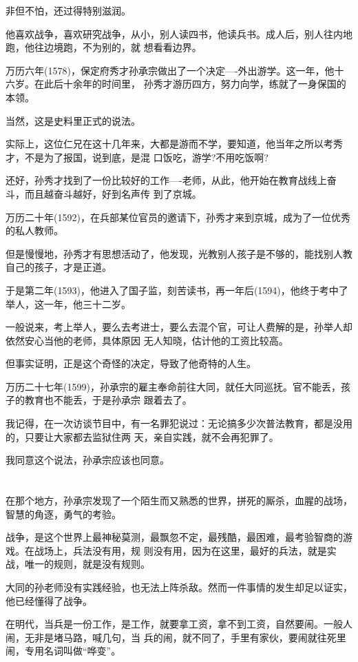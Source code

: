 \documentclass[11pt,a4paper,onecolumn]{article}
\begin{document}
非但不怕，还过得特别滋润。

他喜欢战争，喜欢研究战争，从小，别人读四书，他读兵书。成人后，别人往内地跑，他往边境跑，不为别的，就
想看看边界。

万历六年(1578)，保定府秀才孙承宗做出了一个决定----外出游学。这一年，他十六岁。在此后十余年的时间里，
孙秀才游历四方，努力向学，练就了一身保国的本领。

当然，这是史料里正式的说法。

实际上，这位仁兄在这十几年来，大都是游而不学，要知道，他当年之所以考秀才，不是为了报国，说到底，是混
口饭吃，游学?不用吃饭啊?

还好，孙秀才找到了一份比较好的工作----老师，从此，他开始在教育战线上奋斗，而且越奋斗越好，好到名声传
到了京城。

万历二十年(1592)，在兵部某位官员的邀请下，孙秀才来到京城，成为了一位优秀的私人教师。

但是慢慢地，孙秀才有思想活动了，他发现，光教别人孩子是不够的，能找别人教自己的孩子，才是正道。

于是第二年(1593)，他进入了国子监，刻苦读书，再一年后(1594)，他终于考中了举人，这一年，他三十二岁。

一般说来，考上举人，要么去考进士，要么去混个官，可让人费解的是，孙举人却依然安心当他的老师，具体原因
无人知晓，估计他的工资比较高。

但事实证明，正是这个奇怪的决定，导致了他奇特的人生。

万历二十七年(1599)，孙承宗的雇主奉命前往大同，就任大同巡抚。官不能丢，孩子的教育也不能丢，于是孙承宗
跟着去了。

我记得，在一次访谈节目中，有一名罪犯说过：无论搞多少次普法教育，都是没用的，只要让大家都去监狱住两
天，亲自实践，就不会再犯罪了。

我同意这个说法，孙承宗应该也同意。

\section[\thesection]{}

在那个地方，孙承宗发现了一个陌生而又熟悉的世界，拼死的厮杀，血腥的战场，智慧的角逐，勇气的考验。

战争，是这个世界上最神秘莫测，最飘忽不定，最残酷，最困难，最考验智商的游戏。在战场上，兵法没有用，规
则没有用，因为在这里，最好的兵法，就是实战，唯一的规则，就是没有规则。

大同的孙老师没有实践经验，也无法上阵杀敌。然而一件事情的发生却足以证实，他已经懂得了战争。

在明代，当兵是一份工作，是工作，就要拿工资，拿不到工资，自然要闹。一般人闹，无非是堵马路，喊几句，当
兵的闹，就不同了，手里有家伙，要闹就往死里闹，专用名词叫做``哗变''。
\end{document}
